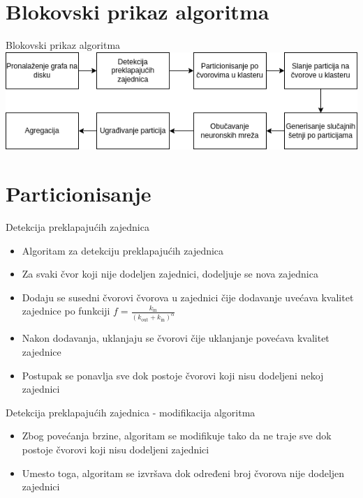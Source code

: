 \documentclass{beamer}
\begin{document}
\section{Blokovski prikaz algoritma}
\begin{frame}{Blokovski prikaz algoritma}
    \includegraphics[width=\textwidth]{./png/Blokovski prikaz algoritma.drawio.png}
\end{frame}

\section{Particionisanje}
\begin{frame}{Detekcija preklapajućih zajednica}
    \begin{itemize}
        \item Algoritam za detekciju preklapajućih zajednica 
        \item Za svaki čvor koji nije dodeljen zajednici, dodeljuje se nova zajednica 
        \item Dodaju se susedni čvorovi čvorova u zajednici čije dodavanje uvećava kvalitet zajednice po funkciji $ f = \frac{k_\text{in}}{(k_\text{out} + k_\text{in})^\alpha} $ 
        \item Nakon dodavanja, uklanjaju se čvorovi čije uklanjanje povećava kvalitet zajednice
        \item Postupak se ponavlja sve dok postoje čvorovi koji nisu dodeljeni nekoj zajednici
    \end{itemize}
\end{frame}

\begin{frame}{Detekcija preklapajućih zajednica - modifikacija algoritma}
    \begin{itemize}
        \item Zbog povećanja brzine, algoritam se modifikuje tako da ne traje sve dok postoje čvorovi koji nisu dodeljeni zajednici
        \item Umesto toga, algoritam se izvršava dok određeni broj čvorova nije dodeljen zajednici
    \end{itemize}
\end{frame}
\end{document}
